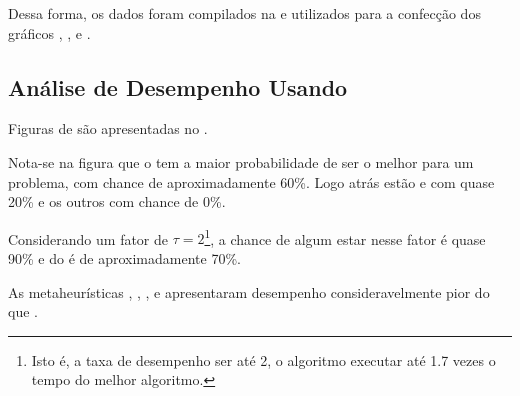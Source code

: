 Dessa forma, os dados foram compilados na  e utilizados para a confecção dos gráficos , , e .

\subsection{Análise de Desempenho Usando \perfprof}
\label{subsubsection:analysis-perfprof}

Figuras de \perfprof são apresentadas no .

Nota-se na figura  que o \graspFirst tem a maior probabilidade de ser o melhor para um problema, com chance de aproximadamente 60\%. Logo atrás estão \graspBest e \geneticVanilla com quase 20\% e os outros com chance de 0\%.

Considerando um fator de $\tau = 2$\footnote{Isto é, a taxa de desempenho ser até 2, o algoritmo executar até 1.7 vezes o tempo do melhor algoritmo.}, a chance de algum \graspFirst estar nesse fator é quase 90\% e do \graspBest é de aproximadamente 70\%.

As metaheurísticas \tabuVanilla, \tabuMod, \geneticVanilla, e \geneticSteady apresentaram desempenho consideravelmente pior do que \graspBest.
